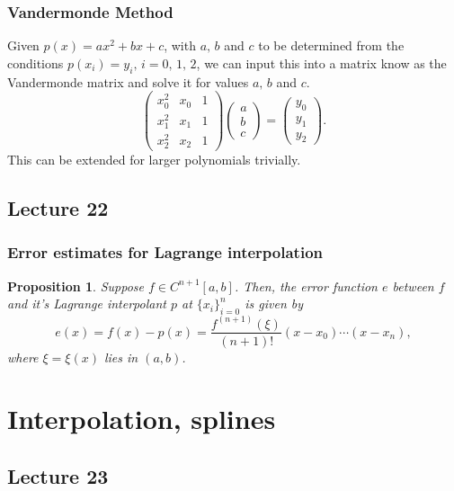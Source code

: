 \documentclass{article}
\newtheorem{proposition}{Proposition}
\begin{document}
\subsubsection{Vandermonde Method}
Given $p(x)=ax^2+bx+c$, with $a,\,b$ and $c$ to be determined from the conditions $p(x_i)=y_i,\, i=0,\,1,\,2$, we can input this into a matrix know as the Vandermonde matrix and solve it for values $a,\,b$ and $c$.
\begin{equation}
    \begin{pmatrix}  x_0^2 & x_0 & 1 \\ x_1^2 & x_1 & 1 \\ x_2^2 & x_2 & 1 \end{pmatrix}\begin{pmatrix} a \\ b \\ c \end{pmatrix} = \begin{pmatrix} y_0 \\ y_1 \\ y_2 \end{pmatrix}.
\end{equation}
This can be extended for larger polynomials trivially.

\subsection{Lecture 22}
\subsubsection{Error estimates for Lagrange interpolation}
\begin{proposition}
    Suppose $f\in C^{n+1}[a,b]$. Then, the error function $e$ between $f$ and it's Lagrange interpolant $p$ at $\{x_i\}_{i=0}^n$ is given by
    \begin{equation}
        e(x)=f(x)-p(x)=\frac{f^{(n+1)}(\xi)}{(n+1)!}(x-x_0)\cdots(x-x_n),\nonumber
    \end{equation}
    where $\xi=\xi(x)$ lies in $(a,b)$.
\end{proposition}


\section{Interpolation, splines}
\subsection{Lecture 23}
\end{document}
